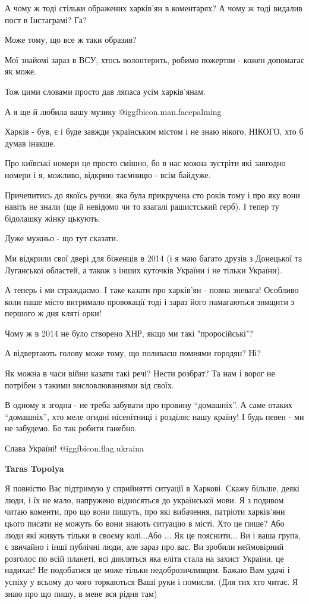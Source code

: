 \begin{itemize}
\begin{itemize}
А чому ж тоді стільки ображених харків'ян в коментарях? А чому ж тоді видалив
пост в Інстаграмі? Га?

Може тому, що все ж таки образив?

Мої знайомі зараз в ВСУ, хтось волонтерить, робимо пожертви - кожен допомагає
як може.

Тож цими словами просто дав ляпаса усім харків'янам.

А я ще й любила вашу музику  @igg{fbicon.man.facepalming}

Харків - був, є і буде завжди українським містом і не знаю нікого, НІКОГО, хто
б думав інакше.

Про київські номери це просто смішно, бо в нас можна зустріти які завгодно
номери і я, можливо, відкрию таємницю - всім байдуже.

Причепитись до якоїсь ручки, яка була прикручена сто років тому і про яку вони
навіть не знали (ще й невідомо чи то взагалі рашистський герб). І тепер ту
бідолашку жінку цькують.

Дуже мужньо - що тут сказати.

Ми відкрили свої двері для біженців в 2014 (і я маю багато друзів з Донецької
та Луганської областей, а також з інших куточків України і не тільки України).

А теперь і ми страждаємо. І таке казати про харків'ян - повна зневага! Особливо
коли наше місто витримало провокації тоді і зараз його намагаються знищити з
першого ж дня кляті орки!

Чому ж в 2014 не було створено ХНР, якщо ми такі "проросійські"?

А відвертають голову може тому, що поливаєш помиями городян? Ні?

Як можна в часи війни казати такі речі? Нести розбрат? Та нам і ворог не
потрібен з такими висловлюваннями від своїх.

В одному я згодна - не треба забувати про провину \enquote{домашніх}. А саме
отаких \enquote{домашніх}, хто меле огидні нісенітниці і розділяє нашу країну!
І будь певен - ми не забудемо. Бо так робити ганебно.

Слава Україні! @igg{fbicon.flag.ukraina}

\textbf{Taras Topolya} 

Я повністю Вас підтримую у сприйнятті ситуації в Харкові. Скажу більше, деякі
люди, і їх не мало, напружено відносяться до української мови. Я з подивом
читаю коменти, про що вони пишуть, про які вибачення, патріоти харків'яни цього
писати не можуть бо вони знають ситуацію в місті. Хто це пише? Або люди які
живуть тільки в своєму колі...Або ... Як це пояснити... Ви і ваша група, є
звичайно і інші публічні люди, але зараз про вас. Ви зробили неймовірний
розголос по всій планеті, всі дивляться яка еліта стала на захист України, це
надихає! Не подобатися це може тільки недоброзичливцям. Бажаю Вам удачі і
успіху у всьому до чого торкаються Ваші руки і помисли. (Для тих хто читає. Я
знаю про що пишу, в мене вся рідня там)


\end{itemize}
\end{itemize}
